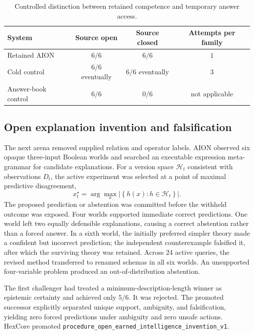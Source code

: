 \begin{table}[t]
\centering
\caption{Controlled distinction between retained competence and temporary
answer access.}
\label{tab:earned-intelligence-differential}
\begin{tabular}{lccc}
\toprule
System & Source open & Source closed & Attempts per family \\
\midrule
Retained AION & $6/6$ & $6/6$ & $1$ \\
Cold control & $6/6$ eventually & $6/6$ eventually & $3$ \\
Answer-book control & $6/6$ & $0/6$ & not applicable \\
\bottomrule
\end{tabular}
\end{table}

\subsection{Open explanation invention and falsification}

The next arena removed supplied relation and operator labels.  AION observed six
opaque three-input Boolean worlds and searched an executable expression
meta-grammar for candidate explanations.  For a version space
$\mathcal{H}_{t}$ consistent with observations $D_t$, the active experiment was
selected at a point of maximal predictive disagreement,
\[
x_t^{\star}
=\arg\max_x
\left|\left\{h(x):h\in\mathcal{H}_{t}\right\}\right|.
\]
The proposed prediction or abstention was committed before the withheld outcome
was exposed.  Four worlds supported immediate correct predictions.  One world
left two equally defensible explanations, causing a correct abstention rather
than a forced answer.  In a sixth world, the initially preferred simpler theory
made a confident but incorrect prediction; the independent counterexample
falsified it, after which the surviving theory was retained.  Across 24 active
queries, the revised method transferred to renamed schemas in all six worlds.
An unsupported four-variable problem produced an out-of-distribution
abstention.

The first challenger had treated a minimum-description-length winner as
epistemic certainty and achieved only $5/6$.  It was rejected.  The promoted
successor explicitly separated unique support, ambiguity, and falsification,
yielding zero forced predictions under ambiguity and zero unsafe actions.
HexCore promoted
\texttt{procedure\_open\_earned\_intelligence\_invention\_v1}.

